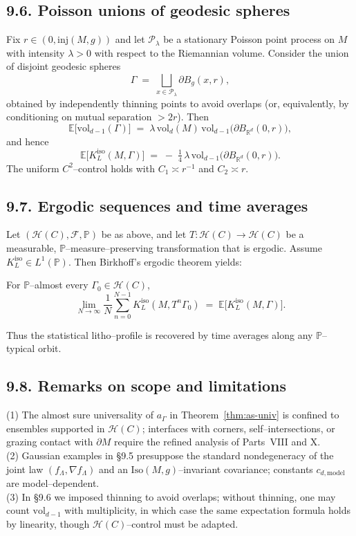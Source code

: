 \subsection*{9.6. Poisson unions of geodesic spheres}
Fix $r\in(0,\mathrm{inj}(M,g))$ and let $\mathcal{P}_\lambda$ be a stationary Poisson point process on $M$ with intensity $\lambda>0$ with respect to the Riemannian volume. Consider the union of disjoint geodesic spheres
\[
\Gamma\;=\;\bigsqcup_{x\in \mathcal{P}_\lambda} \partial B_g(x,r),
\]
obtained by independently thinning points to avoid overlaps (or, equivalently, by conditioning on mutual separation $>2r$). Then
\[
\mathbb{E}\big[\mathrm{vol}_{d-1}(\Gamma)\big]\;=\;\lambda\,\mathrm{vol}_d(M)\,\mathrm{vol}_{d-1}\big(\partial B_{\mathbb{R}^d}(0,r)\big),
\]
and hence
\[
\mathbb{E}\big[K_L^{\mathrm{iso}}(M,\Gamma)\big]\;=\;-\;\tfrac14\,\lambda\,\mathrm{vol}_{d-1}\big(\partial B_{\mathbb{R}^d}(0,r)\big).
\]
The uniform $C^2$–control holds with $C_1\asymp r^{-1}$ and $C_2\asymp r$.

\subsection*{9.7. Ergodic sequences and time averages}
Let $(\mathcal{H}(C),\mathcal{F},\mathbb{P})$ be as above, and let $T:\mathcal{H}(C)\to \mathcal{H}(C)$ be a measurable, $\mathbb{P}$–measure–preserving transformation that is ergodic. Assume $K_L^{\mathrm{iso}}\in L^1(\mathbb{P})$. Then Birkhoff’s ergodic theorem yields:

\begin{theorem}\label{thm:ergodic}
For $\mathbb{P}$–almost every $\Gamma_0\in\mathcal{H}(C)$,
\[
\lim_{N\to\infty}\frac{1}{N}\sum_{n=0}^{N-1} K_L^{\mathrm{iso}}(M,T^n\Gamma_0)\;=\;\mathbb{E}\big[K_L^{\mathrm{iso}}(M,\Gamma)\big].
\]
\end{theorem}

\noindent
Thus the statistical litho–profile is recovered by time averages along any $\mathbb{P}$–typical orbit.

\subsection*{9.8. Remarks on scope and limitations}
(1) The almost sure universality of $a_\Gamma$ in Theorem~\ref{thm:as-univ} is confined to ensembles supported in $\mathcal{H}(C)$; interfaces with corners, self–intersections, or grazing contact with $\partial M$ require the refined analysis of Parts~VIII and X.\\
(2) Gaussian examples in \S9.5 presuppose the standard nondegeneracy of the joint law $(f_\Lambda,\nabla f_\Lambda)$ and an $\mathrm{Iso}(M,g)$–invariant covariance; constants $c_{d,\mathrm{model}}$ are model–dependent.\\
(3) In \S9.6 we imposed thinning to avoid overlaps; without thinning, one may count $\mathrm{vol}_{d-1}$ with multiplicity, in which case the same expectation formula holds by linearity, though $\mathcal{H}(C)$–control must be adapted.

